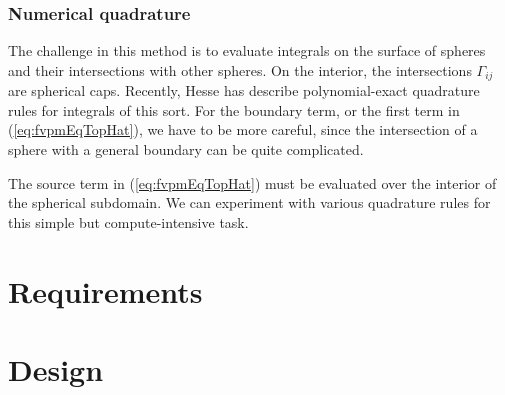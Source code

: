 \documentclass[12pt]{article}
\newcommand{\labelSec}[1]{\label{sec:#1}}
\newcommand{\refEq}[1]{(\ref{eq:#1})}
\begin{document}
\subsubsection*{Numerical quadrature}

The challenge in this method is to evaluate integrals on the surface of spheres and their intersections with other spheres. On the interior, the 
intersections $\Gamma_{ij}$ are spherical caps. Recently, Hesse has describe polynomial-exact quadrature rules for integrals of this sort\cite{Hesse2012}.
For the boundary term, or the first term in \refEq{fvpmEqTopHat}, we have to be more careful, since the intersection of a sphere with a general boundary can 
be quite complicated.

The source term in \refEq{fvpmEqTopHat} must be evaluated over the interior of the spherical subdomain. We can experiment with various 
quadrature rules for this simple but compute-intensive task.

\section{Requirements}\labelSec{Requirements}

\section{Design}\labelSec{Design}



\end{document}
